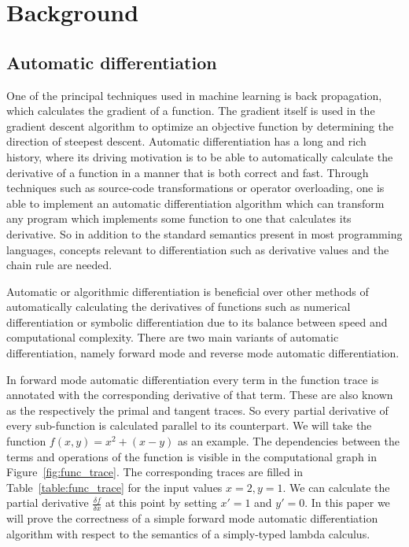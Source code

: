 \documentclass[11pt, final]{article}
\begin{document}

\newpage


\newpage

\setcounter{page}{3}
\tableofcontents
\newpage



\section{Background}

\subsection{Automatic differentiation}


One of the principal techniques used in machine learning is back propagation, which calculates the gradient of a function. The gradient itself is used in the gradient descent algorithm to optimize an objective function by determining the direction of steepest descent\cite{Baydin2015AutomaticDI}.
Automatic differentiation has a long and rich history, where its driving motivation is to be able to automatically calculate the derivative of a function in a manner that is both correct and fast.
Through techniques such as source-code transformations or operator overloading, one is able to implement an automatic differentiation algorithm which can transform any program which implements some function to one that calculates its derivative.
So in addition to the standard semantics present in most programming languages, concepts relevant to differentiation such as derivative values and the chain rule are needed.

Automatic or algorithmic differentiation is beneficial over other methods of automatically calculating the derivatives of functions such as numerical differentiation or symbolic differentiation due to its balance between speed and computational complexity.
There are two main variants of automatic differentiation, namely forward mode and reverse mode automatic differentiation.

In forward mode automatic differentiation every term in the function trace is annotated with the corresponding derivative of that term. These are also known as the respectively the primal and tangent traces. So every partial derivative of every sub-function is calculated parallel to its counterpart. We will take the function $f(x, y) = x^2 + (x - y)$ as an example. The dependencies between the terms and operations of the function is visible in the computational graph in Figure~\ref{fig:func_trace}. The corresponding traces are filled in Table~\ref{table:func_trace} for the input values $x = 2, y = 1$. We can calculate the partial derivative $\frac{\delta f}{\delta x}$ at this point by setting $x' = 1$ and $y' = 0$. In this paper we will prove the correctness of a simple forward mode automatic differentiation algorithm with respect to the semantics of a simply-typed lambda calculus.
\end{document}
